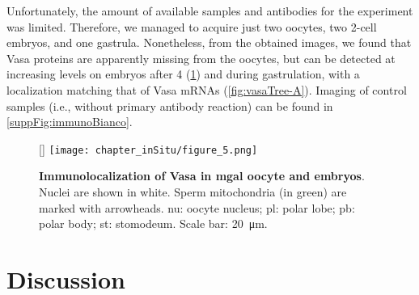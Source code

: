 Unfortunately, the amount of available samples and antibodies for the experiment was limited. Therefore, we managed to acquire just two oocytes, two 2-cell embryos, and one gastrula. Nonetheless, from the obtained images, we found that Vasa proteins are apparently missing from the oocytes, but can be detected at increasing levels on embryos after \qty{4}{\hpf} (\cref{fig:immuno}) and during gastrulation, with a localization matching that of Vasa mRNAs (\cref{fig:vasaTree-A}). Imaging of control samples (i.e., without primary antibody reaction) can be found in \cref{suppFig:immunoBianco}.

\begingroup
\captionsetup[figure]{format=hruleformat}
\begin{figure}
	[\FBwidth]
	{\texttt{[image: chapter\_inSitu/figure\_5.png]}}
	{\caption[\textbf{Immunolocalization of Vasa in \gls{mgal} oocyte and embryos}]
	{
		\textbf{Immunolocalization of Vasa in \gls{mgal} oocyte and embryos}. Nuclei are shown in white. Sperm mitochondria (in green) are marked with arrowheads. nu: oocyte nucleus; pl: polar lobe; pb: polar body; st: stomodeum. Scale bar: \qty{20}{\um}.
	}
	\label{fig:immuno}}
\end{figure}

\section{Discussion} \label{chapter:insitu-discussion}
